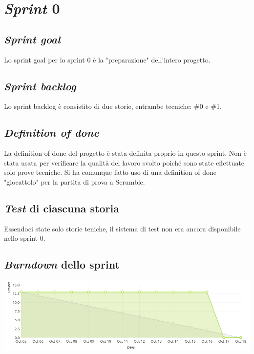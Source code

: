 \documentclass{article}
\begin{document}
\section{\emph{Sprint} 0}

\subsection{\emph{Sprint goal}}

Lo sprint goal per lo sprint 0 è la "preparazione" dell'intero progetto.

\subsection{\emph{Sprint backlog}}

Lo sprint backlog è consistito di due storie, entrambe tecniche: \#0 e \#1.

\subsection{\emph{Definition of done}}

La definition of done del progetto è stata definita proprio in questo sprint.
Non è stata usata per verificare la qualità del lavoro svolto poiché sono state
effettuate solo prove tecniche. Si ha comunque fatto uso di una definition of
done "giocattolo" per la partita di prova a Scrumble.

\subsection{\emph{Test} di ciascuna storia}

Essendoci state solo storie teniche, il sistema di test non era ancora
disponibile nello sprint 0.

\subsection{\emph{Burndown} dello sprint}

\includegraphics[width=\textwidth]{burndown-0}
\end{document}
